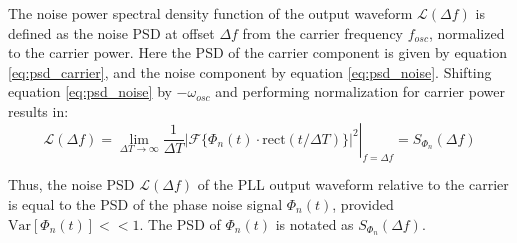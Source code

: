 	 The noise power spectral density function of the output waveform $\mathcal{L}(\Delta f)$ is defined as the noise PSD at offset $\Delta f$ from the carrier frequency $f_{osc}$, normalized to the carrier power. Here the PSD of the carrier component is given by equation \ref{eq:psd_carrier}, and the noise component by equation \ref{eq:psd_noise}. Shifting equation \ref{eq:psd_noise} by $-\omega_{osc}$ and performing normalization for carrier power results in:
	\begin{equation}\label{eq:pn_psd_relation}
		\mathcal{L}(\Delta f) = \left.\lim_{\Delta T\rightarrow\infty}\frac{1}{\Delta T}|\mathcal{F}\{\Phi_{n}(t)\cdot\mathrm{rect}(t/\Delta T)\}|^2 \right|_{f=\Delta f}= S_{\Phi_{n}}(\Delta f)
	\end{equation}

	Thus, the noise PSD $\mathcal{L}(\Delta f)$ of the PLL output waveform relative to the carrier is equal to the PSD of the phase noise signal $\Phi_{n}(t)$, provided $\text{Var}[\Phi_{n}(t)] << 1$. The PSD of $\Phi_{n}(t)$ is notated as $S_{\Phi_{n}}(\Delta f)$.

